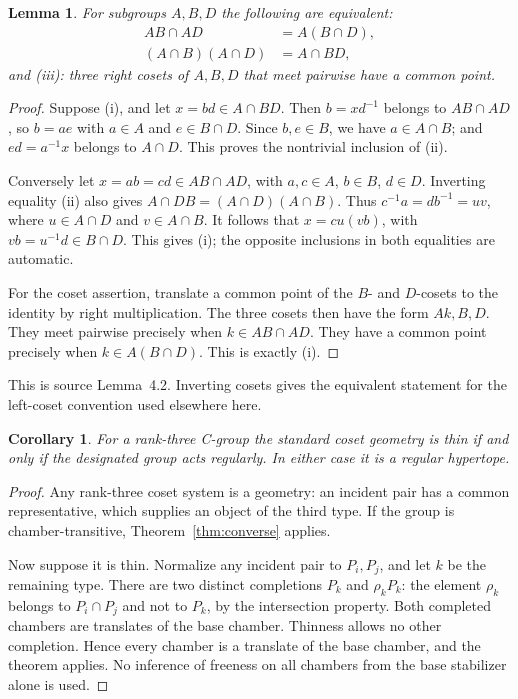 \documentclass[11pt,a4paper]{article}
\newtheorem{lemma}[theorem]{Lemma}
\newtheorem{corollary}[theorem]{Corollary}
\begin{document}
\begin{lemma}\label{lem:helly}
For subgroups $A,B,D$ the following are equivalent:
\begin{align*}
 AB\cap AD&=A(B\cap D),\tag{i}\\
 (A\cap B)(A\cap D)&=A\cap BD,\tag{ii}
\end{align*}
and (iii): three right cosets of $A,B,D$ that meet pairwise have a
common point.
\end{lemma}
\begin{proof}
Suppose (i), and let $x=bd\in A\cap BD$.  Then $b=xd^{-1}$ belongs
to $AB\cap AD$, so $b=ae$ with $a\in A$ and $e\in B\cap D$.
Since $b,e\in B$, we have $a\in A\cap B$; and $ed=a^{-1}x$
belongs to $A\cap D$.  This proves the nontrivial inclusion of (ii).

Conversely let $x=ab=cd\in AB\cap AD$, with $a,c\in A$,
$b\in B$, $d\in D$.  Inverting equality (ii) also gives
$A\cap DB=(A\cap D)(A\cap B)$.  Thus
$c^{-1}a=db^{-1}=uv$, where $u\in A\cap D$ and $v\in A\cap B$.
It follows that $x=cu(vb)$, with $vb=u^{-1}d\in B\cap D$.
This gives (i); the opposite inclusions in both equalities are automatic.

For the coset assertion, translate a common point of the $B$- and
$D$-cosets to the identity by right multiplication.  The three cosets
then have the form $Ak,B,D$.  They meet pairwise precisely when
$k\in AB\cap AD$.  They have a common point precisely when
$k\in A(B\cap D)$.  This is exactly (i).
\end{proof}
This is source Lemma~4.2.  Inverting cosets gives the equivalent statement
for the left-coset convention used elsewhere here.

\begin{corollary}\label{cor:rankthree}
For a rank-three C-group the standard coset geometry is thin if and only
if the designated group acts regularly.  In either case it is a regular
hypertope.
\end{corollary}
\begin{proof}
Any rank-three coset system is a geometry: an incident pair has a common
representative, which supplies an object of the third type.  If the group
is chamber-transitive, Theorem~\ref{thm:converse} applies.

Now suppose it is thin.  Normalize any incident pair to $P_i,P_j$,
and let $k$ be the remaining type.  There are two distinct completions
$P_k$ and $\rho_kP_k$: the element $\rho_k$ belongs to $P_i\cap P_j$
and not to $P_k$, by the intersection property.  Both completed chambers
are translates of the base chamber.  Thinness allows no other completion.
Hence every chamber is a translate of the base chamber, and the theorem
applies.  No inference of freeness on all chambers from the base stabilizer
alone is used.
\end{proof}
\end{document}

